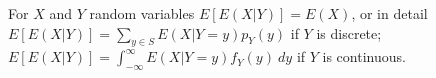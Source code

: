  For $X$ and $Y$ random variables $E[E(X|Y)] = E(X)$, or in detail $E[E(X|Y)] = \sum_{y \in S} E(X|Y=y)p_Y(y)$ if $Y$ is discrete; $E[E(X|Y)] = \int^{\infty}_{-\infty} E(X|Y=y)f_Y(y)\ dy$ if $Y$ is continuous.